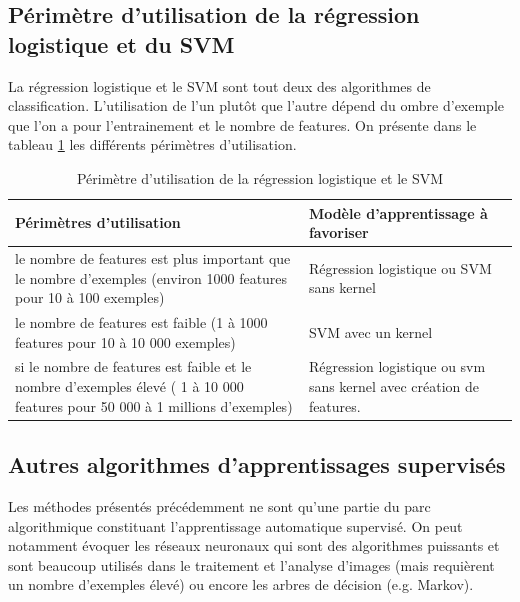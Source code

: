 \subsection{Périmètre d'utilisation de la régression logistique et du SVM}
\label{Le Machine Learning: Choix de la méthode à utiliser: Comparaison de la régression logistique et le SVM}
La régression logistique et le SVM sont tout deux des algorithmes de classification. L'utilisation de l'un plutôt que l'autre dépend du ombre d'exemple que l'on a pour l'entrainement et le nombre de features. On présente dans le tableau \ref {tab:Périmètre d'utilisation de la régression logistique et le SVM} les différents périmètres d'utilisation.

\begin{table}[h]
	\begin{tabular}{ | p{7cm} | p{7cm} |}
		\hline
		Périmètres d'utilisation & Modèle d'apprentissage à favoriser \\
		\hline 
		le nombre de features est plus important que le nombre d'exemples (environ 1000 features pour 10 à 100 exemples) & Régression logistique ou SVM sans kernel \\
		\hline
		le nombre de features est faible (1 à 1000 features pour 10 à 10 000 exemples) & SVM avec un kernel \\
		\hline 
		si le nombre de features est faible et le nombre d'exemples élevé ( 1 à 10 000 features pour 50 000 à 1 millions d'exemples) & Régression logistique ou svm sans kernel avec création de features. \\
		\hline
	\end{tabular}
	\caption[Périmètre d'utilisation de la régression logistique et le SVM]{Périmètre d'utilisation de la régression logistique et le SVM}
	\label {tab:Périmètre d'utilisation de la régression logistique et le SVM}
\end{table}

\subsection{Autres algorithmes d'apprentissages supervisés}
\label{Le Machine Learning: Choix de la méthode à utiliser: Autres algorithmes d'apprentissages}
Les méthodes présentés précédemment ne sont qu'une partie du parc algorithmique constituant l'apprentissage automatique supervisé. On peut notamment évoquer les réseaux neuronaux qui sont des algorithmes puissants et sont beaucoup utilisés dans le traitement et l'analyse d'images (mais requièrent un nombre d'exemples élevé) ou encore les arbres de décision (e.g. Markov).